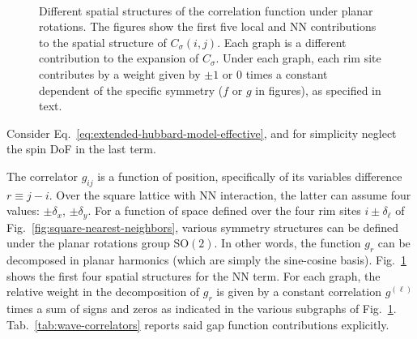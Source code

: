 \begin{figure}
	\centering
	\\[2em]
	\subfloat[$p_x$-wave.]{
		
		\label{subfig:px-wave-correlator}
	}
	\subfloat[$p_y$-wave.]{
		
		\label{subfig:py-wave-correlator}
	}
	\subfloat[$d_{x^2-y^2}$-wave.]{
		
		\label{subfig:d-wave-correlator}
	}
	\caption{Different spatial structures of the correlation function under planar rotations. The figures show the first five local and NN contributions to the spatial structure of $C_\sigma(i,j)$. Each graph is a different contribution to the expansion of $C_\sigma$. Under each graph, each rim site contributes by a weight given by $\pm 1$ or $0$ times a constant dependent of the specific symmetry ($f$ or $g$ in figures), as specified in text.}
	\label{fig:wave-correlators}
\end{figure}

Consider Eq.~\eqref{eq:extended-hubbard-model-effective}, and for simplicity neglect the spin DoF in the last term. 

The correlator $g_{ij}$ is a function of position, specifically of its variables difference $r \equiv j-i$. Over the square lattice with NN interaction, the latter can assume four values: $\pm \delta_x$, $\pm \delta_y$. For a function of space defined over the four rim sites $i \pm \delta_\ell$ of Fig.~\ref{fig:square-nearest-neighbors}, various symmetry structures can be defined under the planar rotations group $\mathrm{SO}(2)$. In other words, the function $g_r$  can be decomposed in planar harmonics (which are simply the sine-cosine basis). Fig.~\ref{fig:wave-correlators} shows the first four spatial structures for the NN term. For each graph, the relative weight in the decomposition of $g_r$ is given by a constant correlation $g^{(\ell)}$ times a sum of signs and zeros as indicated in the various subgraphs of Fig.~\ref{fig:wave-correlators}. Tab.~\ref{tab:wave-correlators} reports said gap function contributions explicitly.


